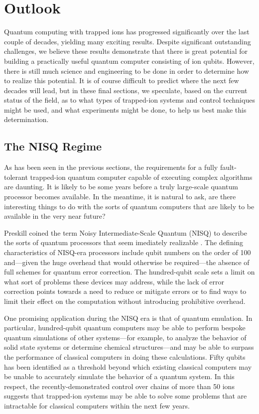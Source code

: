 \documentclass[%
12pt,
 amsmath,amssymb,
]{revtex4-2}
\begin{document}
\section{Outlook}
\label{Outlook}
Quantum computing with trapped ions has progressed significantly over the last couple of decades, yielding many exciting results.  Despite significant outstanding challenges, we believe these results demonstrate that there is great potential for building a practically useful quantum computer consisting of ion qubits.  However, there is still much science and engineering to be done in order to determine how to realize this potential.  It is of course difficult to predict where the next few decades will lead, but in these final sections, we speculate, based on the current status of the field, as to what types of trapped-ion systems and control techniques might be used, and what experiments might be done, to help us best make this determination.

\subsection{The NISQ Regime}

As has been seen in the previous sections, the requirements for a fully fault-tolerant trapped-ion quantum computer capable of executing complex algorithms are daunting. It is likely to be some years before a truly large-scale quantum processor becomes available. In the meantime, it is natural to ask, are there interesting things to do with the sorts of quantum computers that are likely to be available in the very near future?

Preskill coined the term Noisy Intermediate-Scale Quantum (NISQ) to describe the sorts of quantum processors that seem imediately realizable \cite{PreskillNISQ2018}. The defining characteristics of NISQ-era processors include qubit numbers on the order of 100 and---given the huge overhead that would otherwise be required---the absence of full schemes for quantum error correction. The hundred-qubit scale sets a limit on what sort of problems these devices may address, while the lack of error correction points towards a need to reduce or mitigate errors or to find ways to limit their effect on the computation without introducing prohibitive overhead.

One promising application during the NISQ era is that of quantum emulation. In particular, hundred-qubit quantum computers may be able to perform bespoke quantum simulations of other systems---for example, to analyze the behavior of solid state systems or determine chemical structures---and may be able to surpass the performance of classical computers in doing these calculations. Fifty qubits has been identified as a threshold \cite{LundBosonSampling2017} beyond which existing classical computers may be unable to accurately simulate the behavior of a quantum system. In this respect, the recently-demonstrated control over chains of more than 50 ions \cite{Zhang53IonSim2017} suggests that trapped-ion systems may be able to solve some problems that are intractable for classical computers within the next few years.
\end{document}
